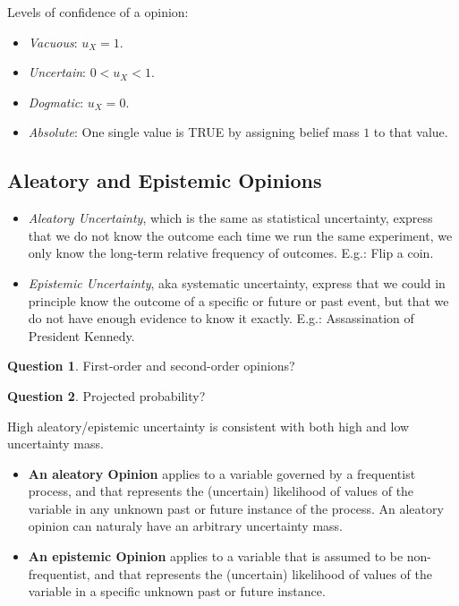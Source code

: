 \documentclass[a4paper,12pt]{article}
\theoremstyle{definition}
\newtheorem{question}{Question}[section]
\numberwithin{equation}{section}
\begin{document}
Levels of confidence of a opinion:
\begin{itemize}
	\item \emph{Vacuous}: $u_X = 1$.
	\item \emph{Uncertain}: $0 < u_X < 1$.
	\item \emph{Dogmatic}: $u_X = 0$.
	\item \emph{Absolute}: One single value is TRUE by assigning belief mass $1$ to that value.
\end{itemize}

\subsection{Aleatory and Epistemic Opinions}

\begin{itemize}
	\item \emph{Aleatory Uncertainty}, which is the same as statistical uncertainty, express that we do not know the outcome each time we run the same experiment, we only know the long-term relative frequency of outcomes. E.g.: Flip a coin.
	\item \emph{Epistemic Uncertainty}, aka systematic uncertainty, express that we could in principle know the outcome of a specific or future or past event, but that we do not have enough evidence to know it exactly. E.g.: Assassination of President Kennedy.
\end{itemize}

\begin{question}
	First-order and second-order opinions?
\end{question}

\begin{question}
	Projected probability?
\end{question}

High aleatory/epistemic uncertainty is consistent with both high and low uncertainty mass.

\begin{itemize}
	\item \textbf{An aleatory Opinion} applies to a variable governed by a frequentist process, and that represents the (uncertain) likelihood of values of the variable in any unknown past or future instance of the process. An aleatory opinion can naturaly have an arbitrary uncertainty mass.
	\item \textbf{An epistemic Opinion} applies to a variable that is assumed to be non-frequentist,
and that represents the (uncertain) likelihood of values of the variable in a specific unknown past or future instance.
\end{itemize}
\end{document}
